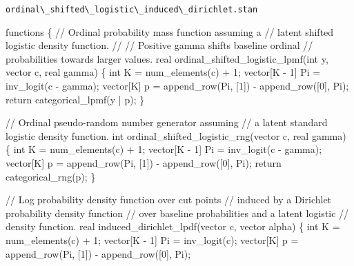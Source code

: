 \documentclass[
  letterpaper,
  DIV=11,
  numbers=noendperiod]{scrartcl}
\newenvironment{Shaded}{\begin{snugshade}}{\end{snugshade}}
\newcommand{\CommentTok}[1]{\textcolor[rgb]{0.37,0.37,0.37}{#1}}
\newcommand{\ControlFlowTok}[1]{\textcolor[rgb]{0.00,0.23,0.31}{#1}}
\newcommand{\DataTypeTok}[1]{\textcolor[rgb]{0.68,0.00,0.00}{#1}}
\newcommand{\DecValTok}[1]{\textcolor[rgb]{0.68,0.00,0.00}{#1}}
\newcommand{\KeywordTok}[1]{\textcolor[rgb]{0.00,0.23,0.31}{#1}}
\newcommand{\NormalTok}[1]{\textcolor[rgb]{0.00,0.23,0.31}{#1}}
\begin{document}
\begin{codelisting}

\caption{\texttt{ordinal\textbackslash\_shifted\textbackslash\_logistic\textbackslash\_induced\textbackslash\_dirichlet.stan}}

\begin{Shaded}
\begin{Highlighting}[]
\KeywordTok{functions}\NormalTok{ \{}
  \CommentTok{// Ordinal probability mass function assuming a}
  \CommentTok{// latent shifted logistic density function.}
  \CommentTok{//}
  \CommentTok{// Positive gamma shifts baseline ordinal}
  \CommentTok{// probabilities towards larger values.}
  \DataTypeTok{real}\NormalTok{ ordinal\_shifted\_logistic\_lpmf(}\DataTypeTok{int}\NormalTok{ y, }\DataTypeTok{vector}\NormalTok{ c, }\DataTypeTok{real}\NormalTok{ gamma) \{}
    \DataTypeTok{int}\NormalTok{ K = num\_elements(c) + }\DecValTok{1}\NormalTok{;}
    \DataTypeTok{vector}\NormalTok{[K {-} }\DecValTok{1}\NormalTok{] Pi = inv\_logit(c {-} gamma);}
    \DataTypeTok{vector}\NormalTok{[K] p = append\_row(Pi, [}\DecValTok{1}\NormalTok{]\textquotesingle{}) {-} append\_row([}\DecValTok{0}\NormalTok{]\textquotesingle{}, Pi);}
    \ControlFlowTok{return}\NormalTok{ categorical\_lpmf(y | p);}
\NormalTok{  \}}

  \CommentTok{// Ordinal pseudo{-}random number generator assuming}
  \CommentTok{// a latent standard logistic density function.}
  \DataTypeTok{int}\NormalTok{ ordinal\_shifted\_logistic\_rng(}\DataTypeTok{vector}\NormalTok{ c, }\DataTypeTok{real}\NormalTok{ gamma) \{}
    \DataTypeTok{int}\NormalTok{ K = num\_elements(c) + }\DecValTok{1}\NormalTok{;}
    \DataTypeTok{vector}\NormalTok{[K {-} }\DecValTok{1}\NormalTok{] Pi = inv\_logit(c {-} gamma);}
    \DataTypeTok{vector}\NormalTok{[K] p = append\_row(Pi, [}\DecValTok{1}\NormalTok{]\textquotesingle{}) {-} append\_row([}\DecValTok{0}\NormalTok{]\textquotesingle{}, Pi);}
    \ControlFlowTok{return}\NormalTok{ categorical\_rng(p);}
\NormalTok{  \}}

  \CommentTok{// Log probability density function over cut points}
  \CommentTok{// induced by a Dirichlet probability density function}
  \CommentTok{// over baseline probabilities and a latent logistic}
  \CommentTok{// density function.}
  \DataTypeTok{real}\NormalTok{ induced\_dirichlet\_lpdf(}\DataTypeTok{vector}\NormalTok{ c, }\DataTypeTok{vector}\NormalTok{ alpha) \{}
    \DataTypeTok{int}\NormalTok{ K = num\_elements(c) + }\DecValTok{1}\NormalTok{;}
    \DataTypeTok{vector}\NormalTok{[K {-} }\DecValTok{1}\NormalTok{] Pi = inv\_logit(c);}
    \DataTypeTok{vector}\NormalTok{[K] p = append\_row(Pi, [}\DecValTok{1}\NormalTok{]\textquotesingle{}) {-} append\_row([}\DecValTok{0}\NormalTok{]\textquotesingle{}, Pi);}


\end{Highlighting}
\end{Shaded}
\end{codelisting}
\end{document}
